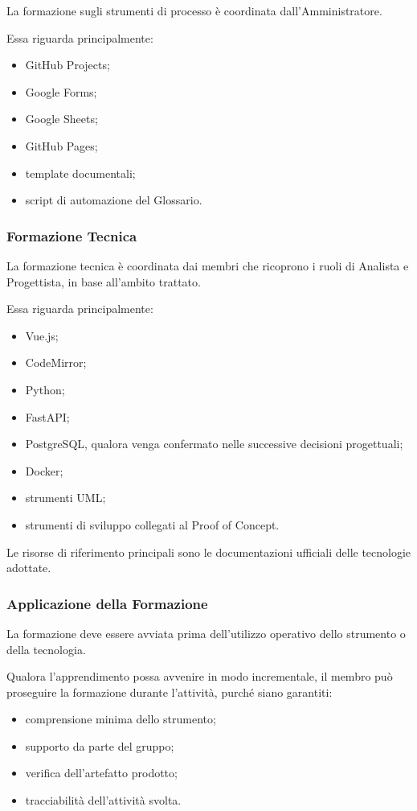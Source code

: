 La formazione sugli strumenti di processo è coordinata dall'Amministratore.

Essa riguarda principalmente:

\begin{itemize}
    \item GitHub Projects;
    \item Google Forms;
    \item Google Sheets;
    \item GitHub Pages;
    \item template documentali;
    \item script di automazione del Glossario.
\end{itemize}


\subsubsection{Formazione Tecnica}

La formazione tecnica è coordinata dai membri che ricoprono i ruoli di Analista e
Progettista, in base all'ambito trattato.

Essa riguarda principalmente:

\begin{itemize}
    \item Vue.js;
    \item CodeMirror;
    \item Python;
    \item FastAPI;
    \item PostgreSQL, qualora venga confermato nelle successive decisioni progettuali;
    \item Docker;
    \item strumenti UML;
    \item strumenti di sviluppo collegati al Proof of Concept.
\end{itemize}

Le risorse di riferimento principali sono le documentazioni ufficiali delle
tecnologie adottate.


\subsubsection{Applicazione della Formazione}

La formazione deve essere avviata prima dell'utilizzo operativo dello strumento o
della tecnologia.

Qualora l'apprendimento possa avvenire in modo incrementale, il membro può
proseguire la formazione durante l'attività, purché siano garantiti:

\begin{itemize}
    \item comprensione minima dello strumento;
    \item supporto da parte del gruppo;
    \item verifica dell'artefatto prodotto;
    \item tracciabilità dell'attività svolta.
\end{itemize}